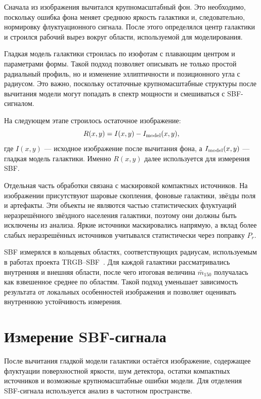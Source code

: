 \documentclass[12pt,a4paper]{article}
\begin{document}
Сначала из изображения вычитался крупномасштабный фон. Это необходимо, поскольку ошибка фона меняет среднюю яркость галактики и, следовательно, нормировку флуктуационного сигнала. После этого определялся центр галактики и строился рабочий вырез вокруг области, используемой для моделирования.

Гладкая модель галактики строилась по изофотам с плавающим центром и параметрами формы. Такой подход позволяет описывать не только простой радиальный профиль, но и изменение эллиптичности и позиционного угла с радиусом. Это важно, поскольку остаточные крупномасштабные структуры после вычитания модели могут попадать в спектр мощности и смешиваться с SBF-сигналом.

На следующем этапе строилось остаточное изображение:
\begin{equation}
    R(x,y) = I(x,y) - I_{\rm model}(x,y),
\end{equation}
где $I(x,y)$ --- исходное изображение после вычитания фона, а $I_{\rm model}(x,y)$ --- гладкая модель галактики. Именно $R(x,y)$ далее используется для измерения SBF.

Отдельная часть обработки связана с маскировкой компактных источников. На изображении присутствуют шаровые скопления, фоновые галактики, звёзды поля и артефакты. Эти объекты не являются частью статистических флуктуаций неразрешённого звёздного населения галактики, поэтому они должны быть исключены из анализа. Яркие источники маскировались напрямую, а вклад более слабых неразрешённых источников учитывался статистически через поправку $P_r$.

SBF измерялся в кольцевых областях, соответствующих радиусам, используемым в работах проекта TRGB--SBF~\cite{Chazov2026}. Для каждой галактики рассматривались внутренняя и внешняя области, после чего итоговая величина $\bar{m}_{150}$ получалась как взвешенное среднее по областям. Такой подход уменьшает зависимость результата от локальных особенностей изображения и позволяет оценивать внутреннюю устойчивость измерения.

\section{Измерение SBF-сигнала}

После вычитания гладкой модели галактики остаётся изображение, содержащее флуктуации поверхностной яркости, шум детектора, остатки компактных источников и возможные крупномасштабные ошибки модели. Для отделения SBF-сигнала используется анализ в частотном пространстве.
\end{document}
